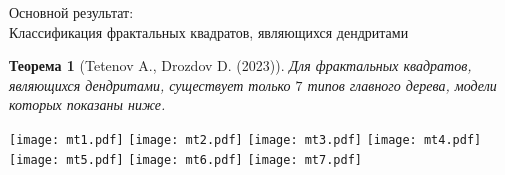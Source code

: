 \documentclass[aspectratio=1610, 10pt, notheorems]{beamer}
\newtheorem{theorem}     {Теорема}
\begin{document}
\begin{frame}{Основной результат:\\Классификация фрактальных квадратов, являющихся дендритами}

\begin{theorem}[Tetenov A., Drozdov D.  (2023)]
Для фрактальных квадратов, являющихся дендритами, существует только $7$ типов главного дерева, модели которых показаны ниже.
\end{theorem}
\texttt{[image: mt1.pdf]}
\hfill
\texttt{[image: mt2.pdf]}
\hfill
\texttt{[image: mt3.pdf]}
\hfill
\texttt{[image: mt4.pdf]}\\
\texttt{[image: mt5.pdf]}
\hfill
\texttt{[image: mt6.pdf]}
\hfill
\texttt{[image: mt7.pdf]}
\end{frame}
\end{document}

